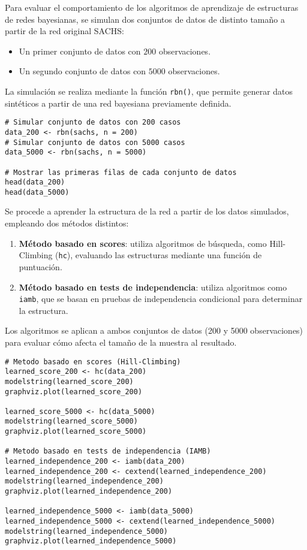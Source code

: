 \documentclass[12pt,letterpaper]{article}
\begin{document}
Para evaluar el comportamiento de los algoritmos de aprendizaje de estructuras de redes bayesianas, se simulan dos conjuntos de datos de distinto tamaño a partir de la red original SACHS:
\begin{itemize}
    \item Un primer conjunto de datos con $200$ observaciones.
    \item Un segundo conjunto de datos con $5000$ observaciones.
\end{itemize}

La simulación se realiza mediante la función \texttt{rbn()}, que permite generar datos sintéticos a partir de una red bayesiana previamente definida.

\begin{lstlisting}
# Simular conjunto de datos con 200 casos
data_200 <- rbn(sachs, n = 200)
# Simular conjunto de datos con 5000 casos
data_5000 <- rbn(sachs, n = 5000)

# Mostrar las primeras filas de cada conjunto de datos
head(data_200)
head(data_5000)
\end{lstlisting}


Se procede a aprender la estructura de la red a partir de los datos simulados, empleando dos métodos distintos:
\begin{enumerate}
    \item \textbf{Método basado en scores}: utiliza algoritmos de búsqueda, como Hill-Climbing (\texttt{hc}), evaluando las estructuras mediante una función de puntuación.
    \item \textbf{Método basado en tests de independencia}: utiliza algoritmos como \texttt{iamb}, que se basan en pruebas de independencia condicional para determinar la estructura.
\end{enumerate}

Los algoritmos se aplican a ambos conjuntos de datos (200 y 5000 observaciones) para evaluar cómo afecta el tamaño de la muestra al resultado.

\begin{lstlisting}
# Metodo basado en scores (Hill-Climbing)
learned_score_200 <- hc(data_200)
modelstring(learned_score_200)
graphviz.plot(learned_score_200)

learned_score_5000 <- hc(data_5000)
modelstring(learned_score_5000)
graphviz.plot(learned_score_5000)

# Metodo basado en tests de independencia (IAMB)
learned_independence_200 <- iamb(data_200)
learned_independence_200 <- cextend(learned_independence_200)
modelstring(learned_independence_200)
graphviz.plot(learned_independence_200)

learned_independence_5000 <- iamb(data_5000)
learned_independence_5000 <- cextend(learned_independence_5000)
modelstring(learned_independence_5000)
graphviz.plot(learned_independence_5000)
\end{lstlisting}
\end{document}

